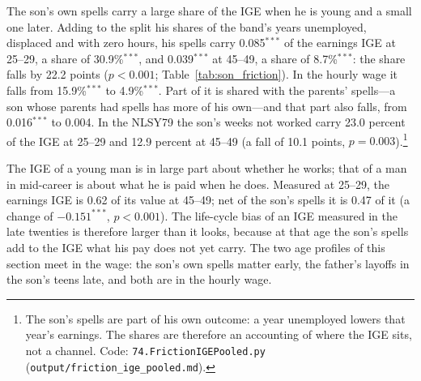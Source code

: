 
The son's own spells carry a large share of the IGE when he is young and a small one later. Adding to the split his
shares of the band's years unemployed, displaced and with zero hours, his spells carry 0.085$^{***}$ of the earnings IGE
at 25--29, a share of 30.9\%$^{***}$, and 0.039$^{***}$ at 45--49, a share of 8.7\%$^{***}$: the share falls by 22.2
points ($p<0.001$; Table~\ref{tab:son_friction}). In the hourly wage it falls from 15.9\%$^{***}$ to 4.9\%$^{***}$. Part
of it is shared with the parents' spells---a son whose parents had spells has more of his own---and that part also
falls, from 0.016$^{***}$ to 0.004. In the NLSY79 the son's weeks not worked carry 23.0 percent of the IGE at 25--29 and
12.9 percent at 45--49 (a fall of 10.1 points, $p = 0.003$).\footnote{The son's spells are part of his own outcome: a year
unemployed lowers that year's earnings. The shares are therefore an accounting of where the IGE sits, not a channel.
Code: \texttt{74.FrictionIGEPooled.py} (\texttt{output/friction\_ige\_pooled.md}).}



The IGE of a young man is in large part about whether he works; that of a man in mid-career is about what he is paid
when he does. Measured at 25--29, the earnings IGE is 0.62 of its value at 45--49; net of the son's spells it is
0.47 of it (a change of $-0.151^{***}$, $p<0.001$). The life-cycle bias of an IGE measured in the late twenties is
therefore larger than it looks, because at that age the son's spells add to the IGE what his pay does not yet carry. The two age profiles of this section meet in the wage: the son's own spells matter early, the father's
layoffs in the son's teens late, and both are in the hourly wage.

